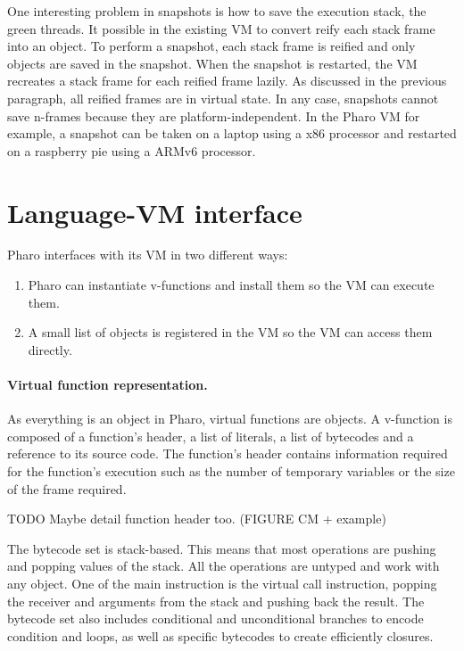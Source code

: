 \documentclass[a4paper,12pt,twoside]{../includes/ThesisStyle}
\begin{document}
One interesting problem in snapshots is how to save the execution stack, \ie the green threads. It possible in the existing VM to convert reify each stack frame into an object. To perform a snapshot, each stack frame is reified and only objects are saved in the snapshot. When the snapshot is restarted, the VM recreates a stack frame for each reified frame lazily. As discussed in the previous paragraph, all reified frames are in virtual state. In any case, snapshots cannot save n-frames because they are platform-independent. In the Pharo VM for example, a snapshot can be taken on a laptop using a x86 processor and restarted on a raspberry pie using a ARMv6 processor.


\section{Language-VM interface}

Pharo interfaces with its VM in two different ways:
\begin{enumerate}
	\item Pharo can instantiate v-functions and install them so the VM can execute them.
	\item A small list of objects is registered in the VM so the VM can access them directly.
\end{enumerate}

\paragraph{Virtual function representation.}

As everything is an object in Pharo, virtual functions are objects. A v-function is composed of a function's header, a list of literals, a list of bytecodes and a reference to its source code. The function's header contains information required for the function's execution such as the number of temporary variables or the size of the frame required.

TODO
Maybe detail function header too.
(FIGURE CM + example)

The bytecode set is stack-based. This means that most operations are pushing and popping values of the stack. All the operations are untyped and work with any object. One of the main instruction is the virtual call instruction, popping the receiver and arguments from the stack and pushing back the result. The bytecode set also includes conditional and unconditional branches to encode condition and loops, as well as specific bytecodes to create efficiently closures.
\end{document}
